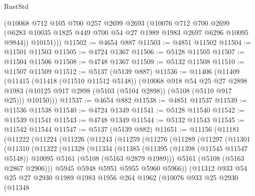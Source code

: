 \begin{lexlean}{RustStd}
\begin{coremodule}
        (@10068
          @712
          @105
          @700
          @257
          @2699
          @2693
          (@10076
            @712
            @700
            @2699
            (@6283 @10035 @1825 @449 @700 @54 @27 @1989 @1983 @2697 @6296 @10095 @9844))
          @10151)))
@11502 := @4654 @887
@11503 := @4851 @11502
@11504 := @11501 @11503
@11505 := @4724 @1367
@11506 := @5128 @11505
@11507 := @11504 @11506
@11508 := @4748 @1367
@11509 := @5132 @11508
@11510 := @11507 @11509
@11512 := @5137 (@5139 @887)
@11536 := @11406
    (@11409
      (@11415
        (@11418 (@11510 @11512 @5148))
        (@10068
          @918
          @54
          @25
          @27
          @2898
          @1983
          (@10125 @917 @2898 (@5103 (@5104 @2898)) (@5108 (@5110 @917 @25)))
          @10150)))
@11537 := @4654 @882
@11538 := @4851 @11537
@11539 := @11536 @11538
@11540 := @4724 @1349
@11541 := @5128 @11540
@11542 := @11539 @11541
@11543 := @4748 @1349
@11544 := @5132 @11543
@11545 := @11542 @11544
@11547 := @5137 (@5139 @882)
@11651 := @11156
    (@11181
      (@11222
        (@11224
          (@11226
            (@11243
              (@11259
                (@11276
                  (@11289
                    (@11297
                      (@11301
                        (@11310
                          (@11322
                            (@11328
                              (@11334
                                (@11385
                                  (@11395
                                    (@11398 (@11545 @11547 @5148))
                                    @10095
                                    @5161
                                    (@5108 (@5163 @2879 @1989)))
                                  @5161
                                  (@5108 (@5163 @2867 @2906)))
                                @5945
                                @5948
                                @5951
                                @5955
                                @5960
                                @5966))
                            (@11312
                              @933
                              @54
                              @25
                              @27
                              @2930
                              @1989
                              @1983
                              @1956
                              @264
                              @1962
                              (@10076
                                @933
                                @25
                                @2930
                                (@11348

\end{coremodule}
\end{lexlean}
